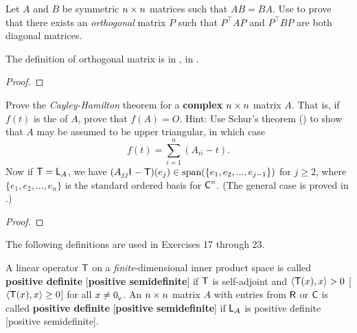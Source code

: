 \begin{exercise} \label{exercise 6.4.15}
Let \(A\) and \(B\) be symmetric \(n \times n\) matrices such that \(AB = BA\).
Use  to prove that there exists an \emph{orthogonal} matrix \(P\) such that \(P^\top A P\) and \(P^\top B P\) are both diagonal matrices.
\end{exercise}

\begin{note}
The definition of orthogonal matrix is in , in .
\end{note}

\begin{proof}
\end{proof}

\begin{exercise} \label{exercise 6.4.16}
Prove the \emph{Cayley-Hamilton} theorem for a \textbf{complex} \(n \times n\) matrix \(A\).
That is, if \(f(t)\) is the \CPOLY{} of \(A\), prove that \(f(A) = O\).
Hint: Use Schur's theorem () to show that \(A\) may be assumed to be upper triangular, in which case
\[
    f(t) = \sum_{i = 1}^n (A_{ii} - t).
\]
Now if \(\textsf{T} = \textsf{L}_A\), we have \((A_{jj} \textsf{I}_{_{}} - \textsf{T})(e_j) \in \operatorname{span}(\{ e_1, e_2, ..., e_{j - 1} \})\) for
\(j \ge 2\), where \(\{ e_1, e_2, ..., e_n \}\) is the standard ordered basis for \(\textsf{C}^n\).
(The general case is proved in .)
\end{exercise}

\begin{proof}
\end{proof}

The following definitions are used in Exercises 17 through 23.
\begin{additional definition} \label{adef 6.6}
A linear operator \(\textsf{T}\) on a \emph{finite}-dimensional inner product space is called \textbf{positive definite} [\textbf{positive semidefinite}] if \(\textsf{T}\) is self-adjoint and \(\left< \textsf{T}(x), x \right> > 0\) [\(\left< \textsf{T}(x), x \right> \ge 0\)] for all \(x \ne 0_{_{\textsf{V}}}\).
An \(n \times n\) matrix \(A\) with entries from \(\textsf{R}\) or \(\textsf{C}\) is called \textbf{positive definite}
[\textbf{positive semidefinite}] if \(\textsf{L}_A\) is positive definite [positive semidefinite].
\end{additional definition}

